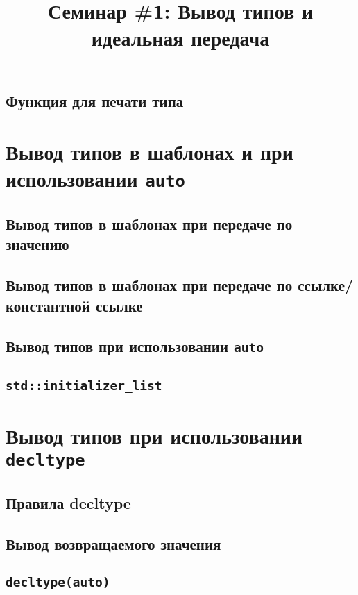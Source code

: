 \documentclass{article}
\begin{document}
\title{Семинар \#1: Вывод типов и идеальная передача \vspace{-5ex}}\date{}\maketitle

\subsection*{Функция для печати типа}

\section*{Вывод типов в шаблонах и при использовании \texttt{auto}}


\subsection*{Вывод типов в шаблонах при передаче по значению}

\subsection*{Вывод типов в шаблонах при передаче по ссылке/константной ссылке}

\subsection*{Вывод типов при использовании \texttt{auto}}

\subsection*{\texttt{std::initializer\_list}}


\section*{Вывод типов при использовании \texttt{decltype}}
\subsection*{Правила decltype}
\subsection*{Вывод возвращаемого значения}
\subsection*{\texttt{decltype(auto)}}
\end{document}
